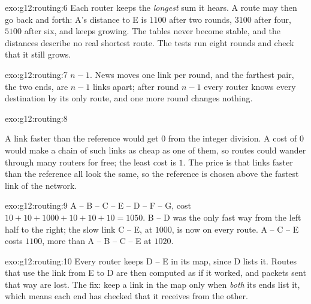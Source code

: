 \begin{solution}{exo:g12:routing:6}
Each router keeps the \emph{longest} sum it hears. A route may then go back and forth: A's distance to E is $1100$
after two rounds, $3100$ after four, $5100$ after six, and keeps growing. The tables never become stable, and the
distances describe no real shortest route. The tests run eight rounds and check that it still grows.
\end{solution}

\begin{solution}{exo:g12:routing:7}
$n - 1$. News moves one link per round, and the farthest pair, the two ends, are $n - 1$ links apart; after round
$n - 1$ every router knows every destination by its only route, and one more round changes nothing.
\end{solution}

\begin{solution}{exo:g12:routing:8}
\smallskip\noindent\hspace*{2em}

\noindent\hspace*{4em}

\smallskip\noindent A link faster than the reference would get $0$ from the integer division. A cost of $0$ would
make a chain of such links as cheap as one of them, so routes could wander through many routers for free; the least
cost is $1$. The price is that links faster than the reference all look the same, so the reference is chosen above
the fastest link of the network.
\end{solution}

\begin{solution}{exo:g12:routing:9}
A -- B -- C -- E -- D -- F -- G, cost $10 + 10 + 1000 + 10 + 10 + 10 = 1050$. B -- D was the only fast way from
the left half to the right; the slow link C -- E, at $1000$, is now on every route. A -- C -- E costs $1100$, more
than A -- B -- C -- E at $1020$.
\end{solution}

\begin{solution}{exo:g12:routing:10}
Every router keeps D -- E in its map, since D lists it. Routes that use the link from E to D are then computed as if
it worked, and packets sent that way are lost. The fix: keep a link in the map only when \emph{both} its ends list
it, which means each end has checked that it receives from the other.
\end{solution}

